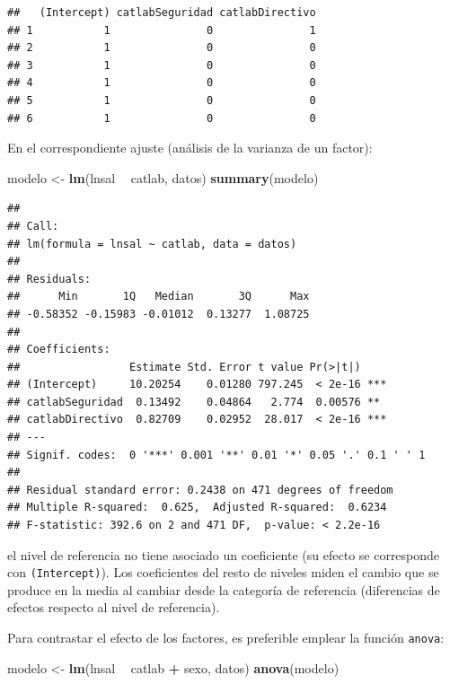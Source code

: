 \documentclass[]{book}
\newenvironment{Shaded}{\begin{snugshade}}{\end{snugshade}}
\newcommand{\KeywordTok}[1]{\textcolor[rgb]{0.13,0.29,0.53}{\textbf{#1}}}
\newcommand{\StringTok}[1]{\textcolor[rgb]{0.31,0.60,0.02}{#1}}
\newcommand{\OperatorTok}[1]{\textcolor[rgb]{0.81,0.36,0.00}{\textbf{#1}}}
\newcommand{\NormalTok}[1]{#1}
\begin{document}
\begin{verbatim}
##   (Intercept) catlabSeguridad catlabDirectivo
## 1           1               0               1
## 2           1               0               0
## 3           1               0               0
## 4           1               0               0
## 5           1               0               0
## 6           1               0               0
\end{verbatim}

En el correspondiente ajuste (análisis de la varianza de un factor):

\begin{Shaded}
\begin{Highlighting}[]
\NormalTok{modelo <-}\StringTok{ }\KeywordTok{lm}\NormalTok{(lnsal }\OperatorTok{~}\StringTok{ }\NormalTok{catlab, datos)}
\KeywordTok{summary}\NormalTok{(modelo)}
\end{Highlighting}
\end{Shaded}

\begin{verbatim}
## 
## Call:
## lm(formula = lnsal ~ catlab, data = datos)
## 
## Residuals:
##      Min       1Q   Median       3Q      Max 
## -0.58352 -0.15983 -0.01012  0.13277  1.08725 
## 
## Coefficients:
##                 Estimate Std. Error t value Pr(>|t|)    
## (Intercept)     10.20254    0.01280 797.245  < 2e-16 ***
## catlabSeguridad  0.13492    0.04864   2.774  0.00576 ** 
## catlabDirectivo  0.82709    0.02952  28.017  < 2e-16 ***
## ---
## Signif. codes:  0 '***' 0.001 '**' 0.01 '*' 0.05 '.' 0.1 ' ' 1
## 
## Residual standard error: 0.2438 on 471 degrees of freedom
## Multiple R-squared:  0.625,  Adjusted R-squared:  0.6234 
## F-statistic: 392.6 on 2 and 471 DF,  p-value: < 2.2e-16
\end{verbatim}

el nivel de referencia no tiene asociado un coeficiente (su efecto se
corresponde con \texttt{(Intercept)}). Los coeficientes del resto de
niveles miden el cambio que se produce en la media al cambiar desde la
categoría de referencia (diferencias de efectos respecto al nivel de
referencia).

Para contrastar el efecto de los factores, es preferible emplear la
función \texttt{anova}:

\begin{Shaded}
\begin{Highlighting}[]
\NormalTok{modelo <-}\StringTok{ }\KeywordTok{lm}\NormalTok{(lnsal }\OperatorTok{~}\StringTok{ }\NormalTok{catlab }\OperatorTok{+}\StringTok{ }\NormalTok{sexo, datos)}
\KeywordTok{anova}\NormalTok{(modelo)}
\end{Highlighting}
\end{Shaded}
\end{document}
